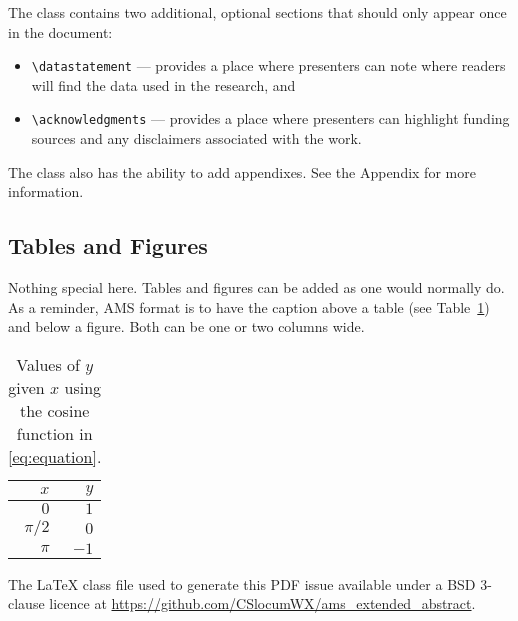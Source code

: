 \documentclass[9pt]{ametsocextabs}
\begin{document}
The class contains two additional, optional sections that should
only appear once in the document:
\begin{itemize}
    \item \texttt{\textbackslash datastatement} ---
        provides a place where presenters can note where readers will
        find the data used in the research, and
    \item \texttt{\textbackslash acknowledgments} ---
        provides a place where presenters can highlight funding sources
        and any disclaimers associated with the work.
\end{itemize}

The class also has the ability to add appendixes. See the Appendix
for more information.

\subsection{Tables and Figures}
Nothing special here. Tables and figures can be added as one would
normally do. As a reminder, AMS format is to have the caption above
a table (see Table~\ref{tab:cos}) and below a figure. Both can be one
or two columns wide.

\begin{table}
    \caption{Values of $y$ given $x$ using the cosine function in \eqref{eq:equation}.}\label{tab:cos}
    \begin{center}
        \begin{tabular}{rr}
            \hline\hline
            $x$ & $y$\\
            \hline
            $0$ & $1$ \\
            $\pi/2$ & $0$ \\
            $\pi$ & $-1$ \\
            \hline
        \end{tabular}
    \end{center}
\end{table}


%
\datastatement The LaTeX class file used to generate this PDF issue
available under a BSD 3-clause licence at
\url{https://github.com/CSlocumWX/ams_extended_abstract}.
\end{document}
